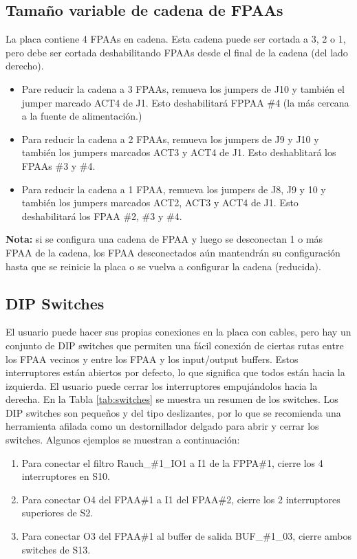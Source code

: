 		\subsection{Tamaño variable de cadena de FPAAs}

	La placa contiene 4 FPAAs en cadena. Esta cadena puede ser cortada a 3, 2 o 1, pero debe ser cortada deshabilitando FPAAs desde el final de la cadena (del lado derecho).

	\begin{itemize}
		\item Pare reducir la cadena a 3 FPAAs, remueva los jumpers de J10 y también el jumper marcado ACT4 de J1. Esto deshabilitará FPPAA \#4 (la más cercana a la fuente de alimentación.)
		\item Para reducir la cadena a 2 FPAAs, remueva los jumpers de J9 y J10 y también los jumpers marcados ACT3 y ACT4 de J1. Esto deshablitará los FPAAs \#3 y \#4.
		\item Para reducir la cadena a 1 FPAA, remueva los jumpers de J8, J9 y 10 y  también los jumpers marcados ACT2, ACT3 y ACT4 de J1. Esto deshabilitará los FPAA \#2, \#3 y \#4.
	\end{itemize}
	\textbf{Nota:} si se configura una cadena de FPAA y luego se desconectan 1 o más FPAA de la cadena, los FPAA desconectados aún mantendrán su configuración hasta que se reinicie la placa o se vuelva a configurar la cadena (reducida).

	\subsection{DIP Switches}
	
	El usuario puede hacer sus propias conexiones en la placa con cables, pero hay un conjunto de DIP switches que permiten una fácil conexión de ciertas rutas entre los FPAA vecinos y entre los FPAA y los input/output buffers. Estos interruptores están abiertos por defecto, lo que significa que todos están hacia la izquierda. El usuario puede cerrar los interruptores empujándolos hacia la derecha. En la Tabla \ref{tab:switches} se muestra un resumen de los switches. Los DIP switches son pequeños y del tipo deslizantes, por lo que se recomienda una herramienta afilada como un destornillador delgado para abrir y cerrar los switches. Algunos ejemplos se muestran a continuación:
	
	\begin{enumerate}
		\item Para conectar el filtro Rauch\_\#1\_IO1 a I1 de la FPPA\#{}1, cierre los 4 interruptores en S10.
		\item Para conectar O4 del FPAA\#{}1 a I1 del FPAA\#{}2, cierre los 2 interruptores superiores de S2.
		\item Para conectar O3 del FPAA\#{}1 al buffer de salida BUF\_\#1\_03, cierre ambos switches de S13.
	\end{enumerate}

